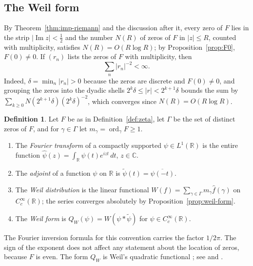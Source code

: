 \documentclass[11pt]{amsart}
\theoremstyle{plain}
\theoremstyle{definition}
\newtheorem{definition}[theorem]{Definition}
\theoremstyle{remark}
\numberwithin{equation}{section}
\newcommand{\C}{\mathbb{C}}
\newcommand{\R}{\mathbb{R}}
\DeclareMathOperator{\Ima}{Im}
\DeclareMathOperator{\ord}{ord}
\renewcommand{\Im}{\Ima}
\begin{document}
\subsection{The Weil form}\label{subsec:weil-form}

By Theorem~\ref{thm:imp-riemann} and the discussion after it, every
zero of $F$ lies in the strip $|\Im z|<\tfrac12$ and the number $N(R)$
of zeros of $F$ in $|z|\le R$, counted with multiplicity, satisfies
$N(R)=O(R\log R)$; by Proposition~\ref{prop:F0}, $F(0)\ne0$. If
$(r_n)$ lists the zeros of $F$ with multiplicity, then
\begin{equation}\label{eq:sum-r2}
\sum_n|r_n|^{-2}<\infty .
\end{equation}
Indeed, $\delta=\min_n|r_n|>0$ because the zeros are discrete and
$F(0)\ne0$, and grouping the zeros into the dyadic shells
$2^k\delta\le|r|<2^{k+1}\delta$ bounds the sum by
$\sum_{k\ge0}N(2^{k+1}\delta)(2^k\delta)^{-2}$, which converges since
$N(R)=O(R\log R)$.

\begin{definition}\label{def:weil-form}
Let $F$ be as in Definition~\ref{def:zeta}, let $\Gamma$ be the set of
distinct zeros of $F$, and for $\gamma\in\Gamma$ let
$m_\gamma=\ord_\gamma F\ge1$.
\begin{enumerate}[label=(\alph*)]
\item The \emph{Fourier transform} of a compactly supported
  $\psi\in L^1(\R)$ is the entire function
  $\widehat\psi(z)=\int_\R\psi(t)e^{izt}\,dt$, $z\in\C$.
\item The \emph{adjoint} of a function $\psi$ on $\R$ is
  $\widetilde\psi(t)=\overline{\psi(-t)}$.
\item The \emph{Weil distribution} is the linear functional
  $W(f)=\sum_{\gamma\in\Gamma}m_\gamma\widehat f(\gamma)$ on
  $C_c^\infty(\R)$; the series converges absolutely by
  Proposition~\ref{prop:weil-form}.
\item The \emph{Weil form} is $Q_W(\psi)=W(\psi*\widetilde\psi)$ for
  $\psi\in C_c^\infty(\R)$.
\end{enumerate}
\end{definition}

The Fourier inversion formula for this convention carries the factor
$1/2\pi$. The sign of the exponent does not affect any statement about
the location of zeros, because $F$ is even. The form $Q_W$ is Weil's
quadratic functional \cite[\S16, p.~16]{Weil1972Explicit}; see
\cite[\S V, p.~9]{Bombieri2000Clay} and
\cite[Theorem~1, p.~191]{Bombieri2000Lincei}.
\end{document}
